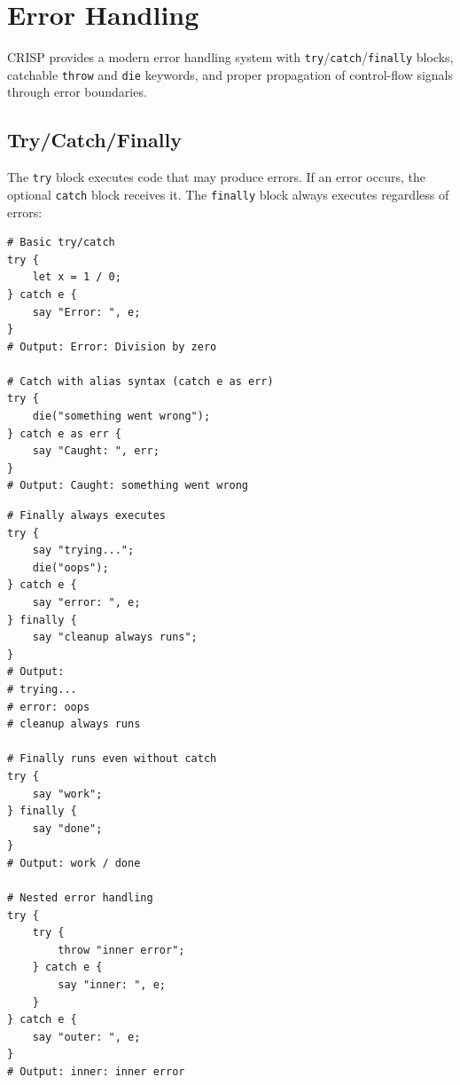 \section{Error Handling}

CRISP provides a modern error handling system with \texttt{try}/\texttt{catch}/\texttt{finally} blocks, catchable \texttt{throw} and \texttt{die} keywords, and proper propagation of control-flow signals through error boundaries.

\subsection{Try/Catch/Finally}

The \texttt{try} block executes code that may produce errors. If an error occurs, the optional \texttt{catch} block receives it. The \texttt{finally} block always executes regardless of errors:

\begin{tcolorbox}[colback=codebg, colframe=darkpurple, colbacktitle=darkpurple, title=\textbf{\textcolor{codegold}{Basic Try/Catch}}, fonttitle=\bfseries, sharp corners]
\begin{lstlisting}
# Basic try/catch
try {
    let x = 1 / 0;
} catch e {
    say "Error: ", e;
}
# Output: Error: Division by zero

# Catch with alias syntax (catch e as err)
try {
    die("something went wrong");
} catch e as err {
    say "Caught: ", err;
}
# Output: Caught: something went wrong
\end{lstlisting}
\end{tcolorbox}

\begin{tcolorbox}[colback=codebg, colframe=darkpurple, colbacktitle=darkpurple, title=\textbf{\textcolor{codegold}{Try/Catch/Finally}}, fonttitle=\bfseries, sharp corners]
\begin{lstlisting}
# Finally always executes
try {
    say "trying...";
    die("oops");
} catch e {
    say "error: ", e;
} finally {
    say "cleanup always runs";
}
# Output:
# trying...
# error: oops
# cleanup always runs

# Finally runs even without catch
try {
    say "work";
} finally {
    say "done";
}
# Output: work / done

# Nested error handling
try {
    try {
        throw "inner error";
    } catch e {
        say "inner: ", e;
    }
} catch e {
    say "outer: ", e;
}
# Output: inner: inner error
\end{lstlisting}
\end{tcolorbox}

